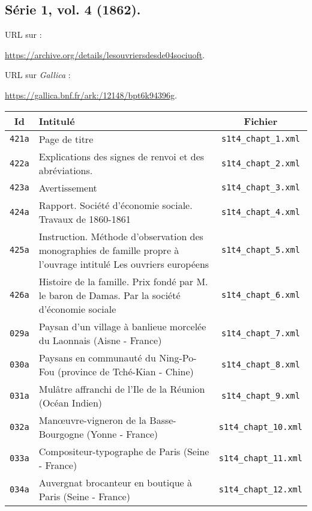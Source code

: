 \subsection{Série 1, vol. 4 (1862).}
\label{mappings1t4}

URL sur \ia{} : 

\url{https://archive.org/details/lesouvriersdesde04sociuoft}.

URL sur \textit{Gallica} : 

\url{https://gallica.bnf.fr/ark:/12148/bpt6k94396g}.

\begin{center}
\begin{longtable}{ | c | p{9.5cm} | c | }
\hline
Id & Intitulé & Fichier \\ \hline
\texttt{421a} & Page de titre & \texttt{s1t4\_chapt\_1.xml} \\ \hline
\texttt{422a} & Explications des signes de renvoi et des abréviations. & \texttt{s1t4\_chapt\_2.xml} \\ \hline
\texttt{423a} & Avertissement & \texttt{s1t4\_chapt\_3.xml} \\ \hline
\texttt{424a} & Rapport. Société d'économie sociale. Travaux de 1860-1861 & \texttt{s1t4\_chapt\_4.xml} \\ \hline
\texttt{425a} & Instruction. Méthode d'observation des monographies de famille propre à l'ouvrage intitulé Les ouvriers européens & \texttt{s1t4\_chapt\_5.xml} \\ \hline
\texttt{426a} & Histoire de la famille. Prix fondé par M. le baron de Damas. Par la société d'économie sociale & \texttt{s1t4\_chapt\_6.xml} \\ \hline
\texttt{029a} & Paysan d'un village à banlieue morcelée du Laonnais (Aisne - France) & \texttt{s1t4\_chapt\_7.xml} \\ \hline
\texttt{030a} & Paysans en communauté du Ning-Po-Fou (province de Tché-Kian - Chine) & \texttt{s1t4\_chapt\_8.xml} \\ \hline
\texttt{031a} & Mulâtre affranchi de l'Ile de la Réunion (Océan Indien) & \texttt{s1t4\_chapt\_9.xml} \\ \hline
\texttt{032a} & Manœuvre-vigneron de la Basse-Bourgogne (Yonne - France) & \texttt{s1t4\_chapt\_10.xml} \\ \hline
\texttt{033a} & Compositeur-typographe de Paris (Seine - France) & \texttt{s1t4\_chapt\_11.xml} \\ \hline
\texttt{034a} & Auvergnat brocanteur en boutique à Paris (Seine - France) & \texttt{s1t4\_chapt\_12.xml} \\ \hline

\end{longtable}
\end{center}

